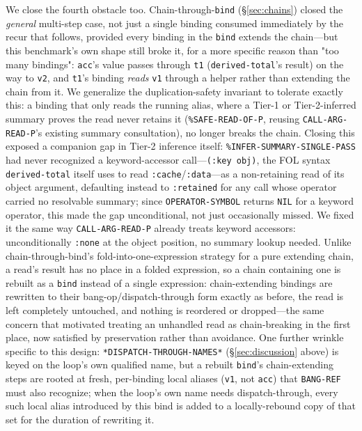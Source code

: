 \documentclass[sigplan,review,anonymous]{acmart}
\begin{document}
We close the fourth obstacle too. Chain-through-\texttt{bind} (§\ref{sec:chains}) closed the \emph{general} multi-step case, not just a single binding consumed immediately by the recur that follows, provided every binding in the \texttt{bind} extends the chain---but this benchmark's own shape still broke it, for a more specific reason than "too many bindings": \texttt{acc}'s value passes through \texttt{t1} (\texttt{derived-total}'s result) on the way to \texttt{v2}, and \texttt{t1}'s binding \emph{reads} \texttt{v1} through a helper rather than extending the chain from it. We generalize the duplication-safety invariant to tolerate exactly this: a binding that only reads the running alias, where a Tier-1 or Tier-2-inferred summary proves the read never retains it (\texttt{\%SAFE-READ-OF-P}, reusing \texttt{CALL-ARG-READ-P}'s existing summary consultation), no longer breaks the chain. Closing this exposed a companion gap in Tier-2 inference itself: \texttt{\%INFER-SUMMARY-SINGLE-PASS} had never recognized a keyword-accessor call---\texttt{(:key obj)}, the FOL syntax \texttt{derived-total} itself uses to read \texttt{:cache}/\texttt{:data}---as a non-retaining read of its object argument, defaulting instead to \texttt{:retained} for any call whose operator carried no resolvable summary; since \texttt{OPERATOR-SYMBOL} returns \texttt{NIL} for a keyword operator, this made the gap unconditional, not just occasionally missed. We fixed it the same way \texttt{CALL-ARG-READ-P} already treats keyword accessors: unconditionally \texttt{:none} at the object position, no summary lookup needed. Unlike chain-through-bind's fold-into-one-expression strategy for a pure extending chain, a read's result has no place in a folded expression, so a chain containing one is rebuilt as a \texttt{bind} instead of a single expression: chain-extending bindings are rewritten to their bang-op/dispatch-through form exactly as before, the read is left completely untouched, and nothing is reordered or dropped---the same concern that motivated treating an unhandled read as chain-breaking in the first place, now satisfied by preservation rather than avoidance. One further wrinkle specific to this design: \texttt{*DISPATCH-THROUGH-NAMES*} (§\ref{sec:discussion} above) is keyed on the loop's own qualified name, but a rebuilt \texttt{bind}'s chain-extending steps are rooted at fresh, per-binding local aliases (\texttt{v1}, not \texttt{acc}) that \texttt{BANG-REF} must also recognize; when the loop's own name needs dispatch-through, every such local alias introduced by this bind is added to a locally-rebound copy of that set for the duration of rewriting it.
\end{document}
